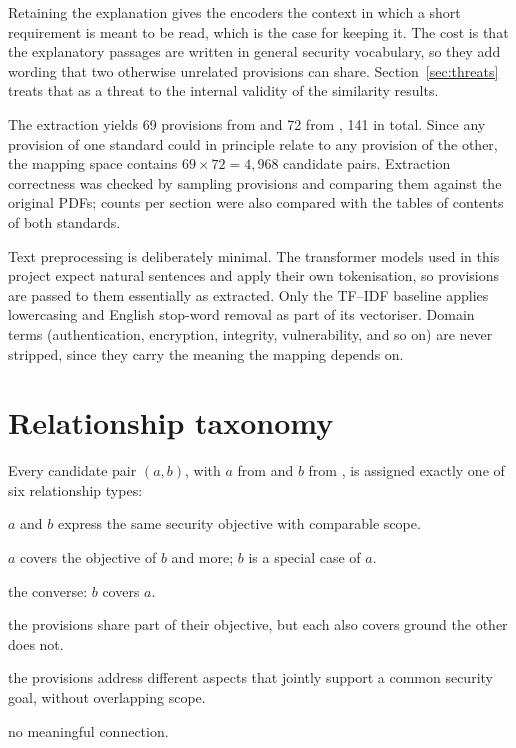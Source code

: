 Retaining the explanation gives the encoders the context in which a
short requirement is meant to be read, which is the case for keeping it. The
cost is that the explanatory passages are written in general security
vocabulary, so they add wording that two otherwise unrelated provisions can
share. Section~\ref{sec:threats} treats that as a threat to the internal
validity of the similarity results.

The extraction yields 69 provisions from \standardA{} and 72 from \standardB{},
141 in total. Since any provision of one standard could in principle relate to
any provision of the other, the mapping space contains $69 \times 72 = 4{,}968$
candidate pairs. Extraction correctness was checked by sampling provisions and
comparing them against the original PDFs; counts per section were also
compared with the tables of contents of both standards.

Text preprocessing is deliberately minimal. The transformer models used in
this project expect natural sentences and apply their own tokenisation, so
provisions are passed to them essentially as extracted. Only the TF--IDF
baseline applies lowercasing and English stop-word removal as part of its
vectoriser. Domain terms (authentication, encryption, integrity,
vulnerability, and so on) are never stripped, since they carry the meaning the
mapping depends on.

\section{Relationship taxonomy}\label{sec:taxonomy}

Every candidate pair $(a, b)$, with $a$ from \standardA{} and $b$ from
\standardB{}, is assigned exactly one of six relationship types:

\begin{description}[style=nextline]
  \item[\textsc{Equivalence}] $a$ and $b$ express the same security objective
  with comparable scope.
  \item[\textsc{Subsumption (A broader)}] $a$ covers the objective of $b$ and
  more; $b$ is a special case of $a$.
  \item[\textsc{Subsumption (B broader)}] the converse: $b$ covers $a$.
  \item[\textsc{Overlap}] the provisions share part of their objective, but
  each also covers ground the other does not.
  \item[\textsc{Complementarity}] the provisions address different aspects
  that jointly support a common security goal, without overlapping scope.
  \item[\textsc{No relation}] no meaningful connection.
\end{description}

